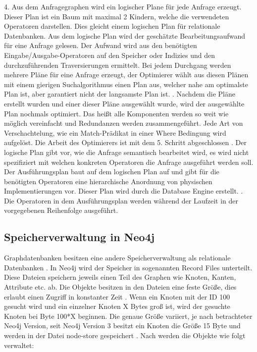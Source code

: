 4. Aus dem Anfragegraphen wird ein logischer Plane für jede Anfrage erzeugt. Dieser Plan ist ein Baum mit maximal 2 Kindern, welche die verwendeten Operatoren darstellen. Dies gleicht einem logischen Plan für relationale Datenbanken. Aus dem logische Plan wird der geschätzte Bearbeitungsaufwand für eine Anfrage gelesen. Der Aufwand wird aus den benötigten Eingabe/Ausgabe-Operatoren auf den Speicher oder Indizies und den durchzuführenden Traversierungen ermittelt. Bei jedem Durchgang werden mehrere Pläne für eine Anfrage erzeugt, der Optimierer wählt aus diesen Plänen mit einem gierigen Suchalgorithmus einen Plan aus, welcher nahe am optimalste Plan ist, aber garantiert nicht der langsamste Plan ist. \newline {}. Nachdem die Pläne erstellt wurden und einer dieser Pläne ausgewählt wurde, wird der ausgewählte Plan nochmals optimiert. Das heißt alle Komponenten werden so weit wie möglich vereinfacht und Redundanzen werden zusammengeführt. Jede Art von Verschachtelung, wie ein Match-Prädikat in einer Where Bedingung wird aufgelöst. Die Arbeit des Optimierers ist mit dem 5. Schritt abgeschlossen \newline {}. Der logische Plan gibt vor, wie die Anfrage semantisch bearbeitet wird, es wird nicht spezifiziert mit welchen konkreten Operatoren die Anfrage ausgeführt werden soll. Der Ausführungsplan baut auf dem logischen Plan auf und gibt für die benötigten Operatoren eine hierarchische Anordnung von physischen  Implementierungen vor. Dieser Plan wird durch die Database Engine erstellt.  \newline {}. Die Operatoren in dem Ausführungsplan werden während der Laufzeit in der vorgegebenen Reihenfolge ausgeführt. 


\subsection{Speicherverwaltung in Neo4j}
Graphdatenbanken besitzen eine andere Speicherverwaltung als relationale Datenbanken \parencite{angles2012comparison}. In Neo4j wird der Speicher in sogenannten Record Files unterteilt. Diese Dateien speichern jeweils einen Teil des Graphen wie Knoten, Kanten, Attribute etc. ab. Die Objekte besitzen in den Dateien eine feste Größe, dies erlaubt einen Zugriff in konstanter Zeit \parencite{robinson2013graph}. Wenn ein Knoten mit der ID 100 gesucht wird und ein einzelner Knoten X Bytes groß ist, wird der gesuchte Knoten bei Byte 100*X beginnen. Die genaue Größe  variiert, je nach betrachteter Neo4j Version, seit Neo4j Version 3 besitzt ein Knoten die Größe 15 Byte und werden in der Datei node-store gespeichert \parencite{Storage}. Nach \parencite{robinson2013graph} werden die Objekte wie folgt verwaltet:
